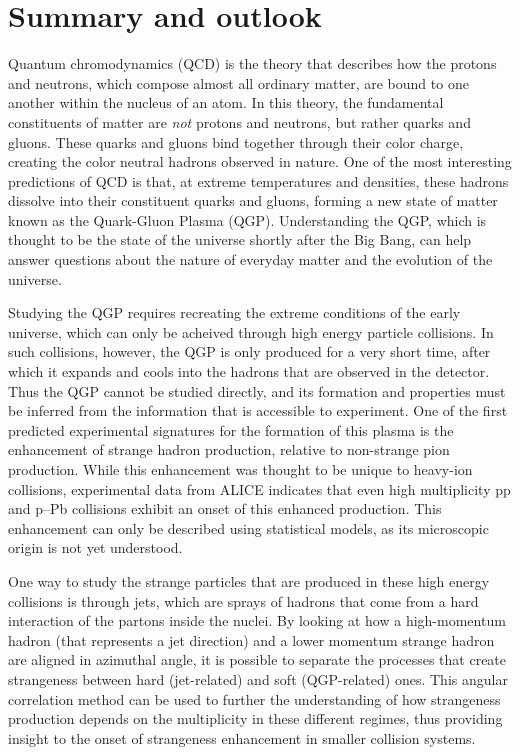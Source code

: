 \chapter{Summary and outlook}

Quantum chromodynamics (QCD) is the theory that describes how the protons and neutrons, which compose almost all ordinary matter, are bound to one another within the nucleus of an atom. In this theory, the fundamental constituents of matter are \textit{not} protons and neutrons, but rather quarks and gluons. These quarks and gluons bind together through their color charge, creating the color neutral hadrons observed in nature. One of the most interesting predictions of QCD is that, at extreme temperatures and densities, these hadrons dissolve into their constituent quarks and gluons, forming a new state of matter known as the Quark-Gluon Plasma (QGP). Understanding the QGP, which is thought to be the state of the universe shortly after the Big Bang, can help answer questions about the nature of everyday matter and the evolution of the universe.

Studying the QGP requires recreating the extreme conditions of the early universe, which can only be acheived through high energy particle collisions. In such collisions, however, the QGP is only produced for a very short time, after which it expands and cools into the hadrons that are observed in the detector. Thus the QGP cannot be studied directly, and its formation and properties must be inferred from the information that is accessible to experiment. One of the first predicted experimental signatures for the formation of this plasma is the enhancement of strange hadron production, relative to non-strange pion production. While this enhancement was thought to be unique to heavy-ion collisions, experimental data from ALICE indicates that even high multiplicity pp and p--Pb collisions exhibit an onset of this enhanced production. This enhancement can only be described using statistical models, as its microscopic origin is not yet understood.

One way to study the strange particles that are produced in these high energy collisions is through jets, which are sprays of hadrons that come from a hard interaction of the partons inside the nuclei. By looking at how a high-momentum hadron (that represents a jet direction) and a lower momentum strange hadron are aligned in azimuthal angle, it is possible to separate the processes that create strangeness between hard (jet-related) and soft (QGP-related) ones. This angular correlation method can be used to further the understanding of how strangeness production depends on the multiplicity in these different regimes, thus providing insight to the onset of strangeness enhancement in smaller collision systems.

